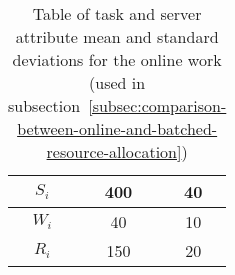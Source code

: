 \begin{table}[h]
\begin{minipage}{2.8in}
\begin{tabular}{|c|c|c|}
            $S_i$          & 400  & 40                 \\ \hline
            $W_i$          & 40   & 10                 \\ \hline
            $R_i$          & 150  & 20                 \\ \hline
        \end{tabular}
        \caption{Table of task and server attribute mean and standard deviations for the online work
        (used in subsection~\ref{subsec:comparison-between-online-and-batched-resource-allocation})}
    \end{minipage}
    \label{tab:synthetic-models}
\end{table}